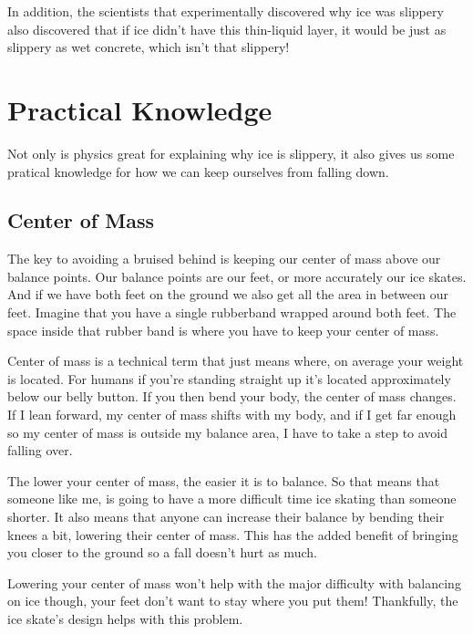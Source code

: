 \documentclass[12pt]{article}
\begin{document}
In addition, the scientists that experimentally discovered why ice was slippery 
also discovered that if ice didn't have this thin-liquid layer, it would be 
just as slippery as wet concrete, which 
isn't that slippery!

\section{Practical Knowledge}
Not only is physics great for explaining why ice is slippery, 
it also gives us some pratical knowledge for how we can keep
ourselves from falling down. 

\subsection{Center of Mass}
The key to avoiding a bruised behind is keeping 
our center of mass above our balance points. Our balance points
are our feet, or more accurately our ice skates. And if we have both
feet on the ground we also get all the area in between our feet.
Imagine that you have a single rubberband wrapped around both feet.
The space inside that rubber band is where you have to keep your
center of mass.

Center of mass is a technical term that just means where, on average
your weight is located.  For humans if you're standing
straight up it's located approximately  below our belly button. 
If you then bend your body, the center of mass changes. If I lean forward, 
my center of mass shifts with my body, and if I get far enough so my center 
of mass is outside my balance area, I have to take a step to avoid 
falling over. 

The lower your center
of mass, the easier it is to balance. So that means that someone
like me, is going to have a more difficult time ice skating than
someone shorter. It also means that anyone can increase their 
balance by bending their knees a bit, lowering their center of mass. 
This has the added benefit of bringing you closer to the ground so 
a fall doesn't hurt as much.

Lowering your center of mass won't help with the major difficulty 
with balancing on ice though, your feet don't want to stay 
where you put them! Thankfully, the ice skate's design helps 
with this problem. 
\end{document}
